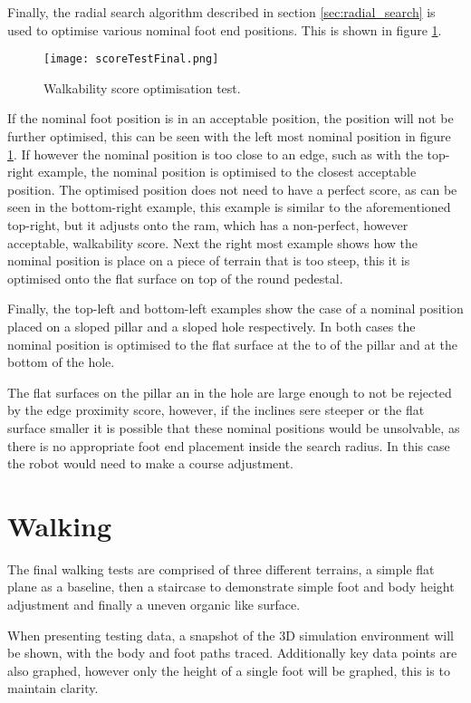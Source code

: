     Finally, the radial search algorithm described in section \ref{sec:radial_search} is used to optimise various nominal foot end positions.
    This is shown in figure \ref{fig:optimisation_test}.
    \begin{figure}[h]
        \centering
        \texttt{[image: scoreTestFinal.png]}
        \caption{Walkability score optimisation test.}
        \label{fig:optimisation_test}
    \end{figure}
    If the nominal foot position is in an acceptable position, the position will not be further optimised, this can be seen with the left most
    nominal position in figure \ref{fig:optimisation_test}. If however the nominal position is too close to an edge, such as with the top-right example, 
    the nominal position is optimised to the closest acceptable position. The optimised position does not need to have a perfect score, as can be seen in the bottom-right example, this example is similar to 
    the aforementioned top-right, but it adjusts onto the ram, which has a non-perfect, however acceptable, walkability score.
    Next the right most example shows how the nominal position is place on a piece of terrain that is too steep, this it is optimised onto the flat surface on top of the round pedestal. 
    
    Finally, the top-left and bottom-left examples show the case of a nominal position placed on a sloped pillar and a sloped hole respectively.
    In both cases the nominal position is optimised to the flat surface at the to of the pillar and at the bottom of the hole.
    
    The flat surfaces on the pillar an in the hole are large enough to not be rejected by the edge proximity score, however, if the inclines sere steeper or the flat surface smaller it is possible that these nominal positions would be
    unsolvable, as there is no appropriate foot end placement inside the search radius. In this case the robot would need to make a course adjustment.

\newpage
\section{Walking}
    The final walking tests are comprised of three different terrains, a simple flat plane as a baseline, then a staircase to demonstrate simple foot and body height adjustment and
    finally a uneven organic like surface.
    
    When presenting testing data, a snapshot of the 3D simulation environment will be shown, with the body and foot paths traced. Additionally key data points
    are also graphed, however only the height of a single foot will be graphed, this is to maintain clarity.

